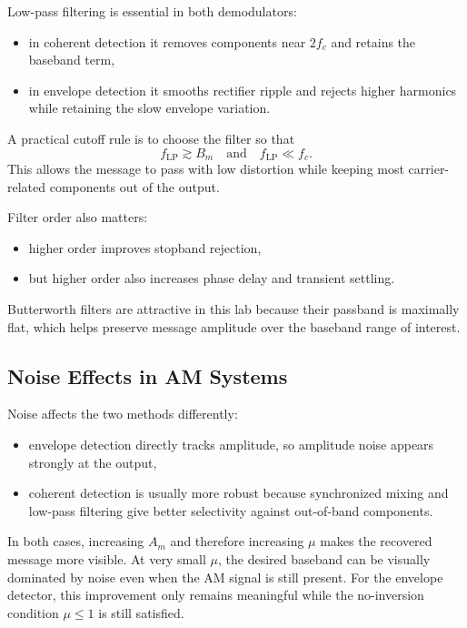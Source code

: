 Low-pass filtering is essential in both demodulators:
\begin{itemize}
\item in coherent detection it removes components near $2f_c$ and retains the
baseband term,
\item in envelope detection it smooths rectifier ripple and rejects higher
harmonics while retaining the slow envelope variation.
\end{itemize}

A practical cutoff rule is to choose the filter so that
\begin{equation}
f_{\mathrm{LP}} \gtrsim B_m
\quad \text{and} \quad
f_{\mathrm{LP}} \ll f_c.
\end{equation}
This allows the message to pass with low distortion while keeping most
carrier-related components out of the output.

Filter order also matters:
\begin{itemize}
\item higher order improves stopband rejection,
\item but higher order also increases phase delay and transient settling.
\end{itemize}
Butterworth filters are attractive in this lab because their passband is
maximally flat, which helps preserve message amplitude over the baseband range
of interest.

\subsection{Noise Effects in AM Systems}

Noise affects the two methods differently:
\begin{itemize}
\item envelope detection directly tracks amplitude, so amplitude noise appears
strongly at the output,
\item coherent detection is usually more robust because synchronized mixing and
low-pass filtering give better selectivity against out-of-band components.
\end{itemize}

In both cases, increasing $A_m$ and therefore increasing $\mu$ makes the
recovered message more visible. At very small $\mu$, the desired baseband can be
visually dominated by noise even when the AM signal is still present. For the
envelope detector, this improvement only remains meaningful while the
no-inversion condition $\mu \le 1$ is still satisfied.


